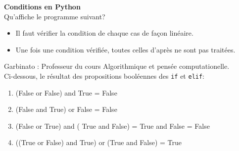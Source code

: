 \begin{Exercice}[5 minutes] \textbf{Conditions en Python}\\
  Qu'affiche le programme suivant?
  
   
    \begin{conseil}
      	\begin{itemize}
      		\item Il faut vérifier la condition de chaque cas de façon linéaire.
      		\item Une fois une condition vérifiée, toutes celles d'après ne sont pas traitées.
      	\end{itemize}
        
    \end{conseil}
    \begin{solution}
    
    Garbinato : Professeur du cours Algorithmique et pensée computationelle. \\
    
    Ci-dessous, le résultat des propositions booléennes des \lstinline{if} et \lstinline{elif}: \\
    
    \begin{enumerate}
    	\item (False or False) and True = False
    	\item (False and True) or False = False
    	\item (False or True) and ( True and False) = True and False = False
    	\item ((True or False) and True) or (True and False) = True
    \end{enumerate}
           
    \end{solution}   
\end{Exercice}


\newpage
